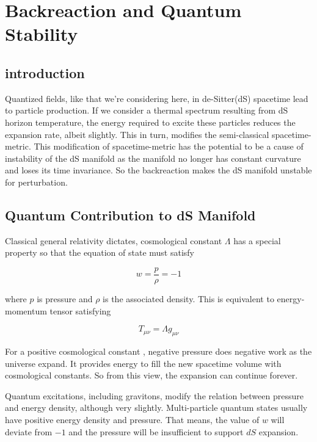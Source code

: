 \chapter{Backreaction and Quantum Stability}

\section{introduction}
Quantized fields, like that we're considering here, in de-Sitter(dS) spacetime lead to particle production. If we consider a thermal spectrum resulting from dS horizon temperature, the energy required to excite these particles reduces the expansion rate, albeit slightly. This in turn, modifies the semi-classical spacetime-metric. This modification of spacetime-metric has the potential to be a cause of instability of the dS manifold as the manifold no longer has constant curvature and loses its time invariance. So the backreaction makes the dS manifold unstable for perturbation. 

\section{Quantum Contribution to dS Manifold}

Classical general relativity dictates, cosmological constant $\Lambda$ has a special property so that the equation of state must satisfy 

\begin{equation}
w = \frac{p}{\rho}=-1
\end{equation}

where $p$ is pressure and $\rho$ is the associated density. This is equivalent to energy-momentum tensor satisfying 

\begin{equation}
T_{\mu\nu}= \Lambda g_{\mu\nu}
\end{equation}

For a positive cosmological constant , negative pressure does negative work as the universe expand. It provides energy to fill the new spacetime volume with cosmological constants. So from this view, the expansion can continue forever. 

Quantum excitations, including gravitons, modify the relation between pressure and energy density, although very slightly. Multi-particle quantum states usually have positive energy density and pressure. That means, the value of $w$ will deviate from $-1$ and the pressure will be insufficient to support $dS$ expansion. 

